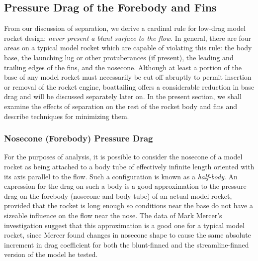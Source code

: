 \subsection{Pressure Drag of the Forebody and Fins}\label{ch3:sec:4.3}

From our discussion of separation, we derive a cardinal rule for low-drag
model rocket design: \emph{never present a blunt surface to the flow}. In
general, there are four areas on a typical model rocket which are capable of
violating this rule: the body base, the launching lug or other protuberances
(if present), the leading and trailing edges of the fins, and the nosecone.
Although at least a portion of the base of any model rocket must necessarily
be cut off abruptly to permit insertion or removal of the rocket engine,
boattailing offers a considerable reduction in base drag and will be discussed
separately later on. In the present section, we shall examine the effects of
separation on the rest of the rocket body and fins and describe techniques
for minimizing them.

\subsubsection{Nosecone (Forebody) Pressure Drag}\label{ch3:sec:4.3.1}

For the purposes of analysis, it is possible to consider the nosecone of a
model rocket as being attached to a body tube of effectively infinite length
oriented with its axis parallel to the flow. Such a configuration is known as
a \emph{half-body}. An expression for the drag on such a body is a good
approximation to the pressure drag on the forebody (nosecone and body tube) of
an actual model rocket, provided that the rocket is long enough so conditions
near the base do not have a sizeable influence on the flow near the nose. The
data of Mark Mercer's investigation suggest that this approximation is a good
one for a typical model rocket, since Mercer found changes in nosecone shape
to cause the same absolute increment in drag coefficient for both the
blunt-finned and the streamline-finned version of the model he tested.

